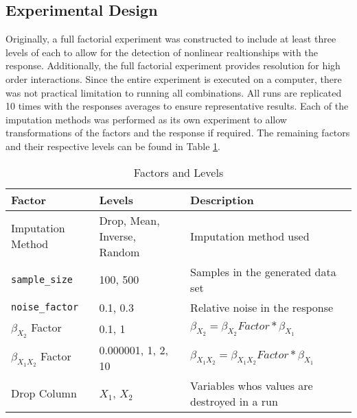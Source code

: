 \documentclass[../../paper.tex]{subfiles}
\begin{document}
\subsection{Experimental Design}
Originally, a full factorial experiment was constructed to include at least three levels of each to allow for the detection of nonlinear realtionships with the response.
Additionally, the full factorial experiment provides resolution for high order interactions. Since the entire experiment is executed on a computer, there was not practical limitation to running all combinations.
All runs are replicated 10 times with the responses averages to ensure representative results. Each of the imputation methods was performed as its own experiment to allow transformations of the factors and the response if required. The remaining factors and their respective levels can be found in Table \ref{table:factors_and_levels}.


\begin{table}[H]
\begin{center}\label{table:factors_and_levels}
    \begin{tabular}{  l | p{1.9in} | l   }

      \rule{0pt}{14pt} \textbf{Factor} & \textbf{Levels} & \textbf{Description} \\ \hline
      \rule{0pt}{14pt} Imputation Method & Drop, Mean, Inverse, Random & Imputation method used \\ %
      \rule{0pt}{14pt} \texttt{sample_size} & 100, 500 &  Samples in the generated data set \\ %
      \rule{0pt}{14pt} \texttt{noise_factor} & 0.1, 0.3 &  Relative noise in the response \\ %
      \rule{0pt}{14pt} $\beta_{X_{2}}$ Factor & 0.1, 1 &  $\beta_{X_{2}} = \beta_{X_{2}} Factor * \beta_{X_{1}}$ \\ %
      \rule{0pt}{14pt} $\beta_{X_{1}X_{2}}$ Factor & 0.000001, 1, 2, 10 &  $\beta_{X_{1}X_{2}} = \beta_{X_{1}X_{2}} Factor * \beta_{X_{1}}$ \\ %
      \rule{0pt}{14pt} Drop Column & $X_{1}$, $X_{2}$ & Variables whos values are destroyed in a run \\ %
    \end{tabular}
    \caption{Factors and Levels}\label{table:factors_and_levels}
\end{center}
\end{table}
\end{document}
